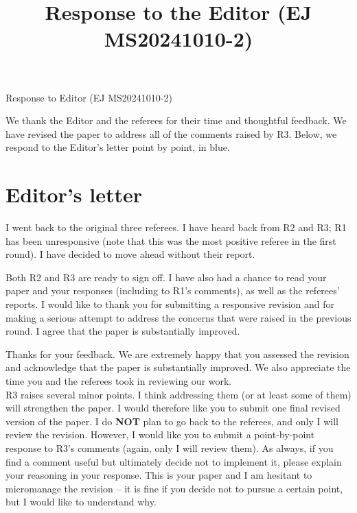 \documentclass[11pt]{article}
\author{}
\title{Response to the Editor (EJ MS20241010-2)}
\date{}
\newcommand{\comment}[1]{\begingroup #1\endgroup}
\newcommand{\answer}[1]{\begingroup\color{navy}#1\endgroup}
\begin{document}

\begin{center}
   \LARGE{Response to Editor (EJ MS20241010-2)}
\end{center}

\vspace{0.5em}

\vspace{0.5em}
\noindent \answer{We thank the Editor and the referees for their time and thoughtful feedback. We have revised the paper to address all of the comments raised by R3. Below, we respond to the Editor's letter point by point, in blue. }\par

% 

\section*{Editor's letter}


\comment{I went back to the original three referees. I have heard back from R2 and R3; R1 has been unresponsive (note that this was the most positive referee in the first round). I have decided to move ahead without their report.}\par

\comment{Both R2 and R3 are ready to sign off. I have also had a chance to read your paper and your responses (including to R1's comments), as well as the referees' reports. I would like to thank you for submitting a responsive revision and for making a serious attempt to address the concerns that were raised in the previous round. I agree that the paper is substantially improved.}\par

\answer{Thanks for your feedback. We are extremely happy that you assessed the revision and acknowledge that the paper is substantially improved. We also appreciate the time you and the referees took in reviewing our work.}\\


\comment{R3 raises several minor points. I think addressing them (or at least some of them) will strengthen the paper. I would therefore like you to submit one final revised version of the paper. I do \textbf{NOT} plan to go back to the referees, and only I will review the revision. However, I would like you to submit a point-by-point response to R3's comments (again, only I will review them). As always, if you find a comment useful but ultimately decide not to implement it, please explain your reasoning in your response. This is your paper and I am hesitant to micromanage the revision -- it is fine if you decide not to pursue a certain point, but I would like to understand why.}\par
\end{document}
